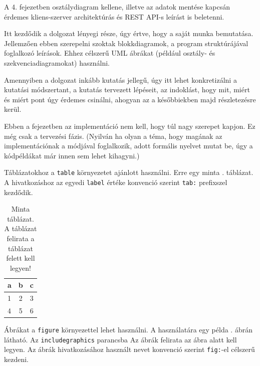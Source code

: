 
A 4. fejezetben osztálydiagram kellene, illetve az adatok mentése kapcsán érdemes kliens-szerver architektúrás és REST API-s leírást is beletenni.

Itt kezdődik a dolgozat lényegi része, úgy értve, hogy a saját munka bemutatása.
Jellemzően ebben szerepelni szoktak blokkdiagramok, a program struktúrájával foglalkozó leírások.
Ehhez célszerű UML ábrákat (például osztály- és szekvenciadiagramokat) használni.

Amennyiben a dolgozat inkább kutatás jellegű, úgy itt lehet konkretizálni a kutatási módszertant, a kutatás tervezett lépéseit, az indoklást, hogy mit, miért és miért pont úgy érdemes csinálni, ahogyan az a későbbiekben majd részletezésre kerül.

Ebben a fejezetben az implementáció nem kell, hogy túl nagy szerepet kapjon.
Ez még csak a tervezési fázis.
(Nyilván ha olyan a téma, hogy magának az implementációnak a módjával foglalkozik, adott formális nyelvet mutat be, úgy a kódpéldákat már innen sem lehet kihagyni.)


Táblázatokhoz a \texttt{table} környezetet ajánlott használni.
Erre egy minta . táblázat.
A hivatkozáshoz az egyedi \texttt{label} értéke konvenció szerint \texttt{tab:} prefixszel kezdődik.

\begin{table}[h]
\centering
\caption{Minta táblázat. A táblázat felirata a táblázat felett kell legyen!}
\label{tab:minta}
\begin{tabular}{l|c|c|}
a & b & c \\
\hline
1 & 2 & 3 \\
4 & 5 & 6 \\
\hline
\end{tabular}
\end{table}


Ábrákat a \texttt{figure} környezettel lehet használni.
A használatára egy példa . ábrán látható.
Az \texttt{includegraphics} parancsba 
Az ábrák felirata az ábra alatt kell legyen.
Az ábrák hivatkozásához használt nevet konvenció szerint \texttt{fig:}-el célszerű kezdeni.

